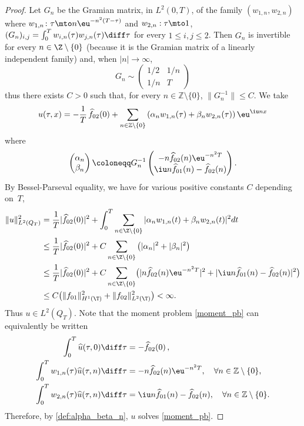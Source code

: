 \begin{proof}
Let $G_n$ be the Gramian matrix, in $L^2(0,T)$, of the family $(w_{1,n},w_{2,n})$ where $w_{1,n}\colon\tau \mto n \eu^{-n^2(T-\tau)}$ and $w_{2,n}: \tau \mto 1$, \ie $(G_n)_{i,j}=\int_0^T w_{i,n}(\tau) w_{j,n}(\tau) \diff\tau$ for every $1 \leq i,j \leq 2$.
Then $G_n$ is invertible for every $n\in\Z\setminus\{0\}$
(because it is the Gramian matrix of a linearly independent family)
and, when $|n| \to \infty$,
\[
G_n \sim \begin{pmatrix}
1/2 & 1/n \\ 1/n & T
\end{pmatrix}
\]
thus there exists $C>0$ such that, for every $n\in\mathbb{Z} \setminus\{0\}$, $\| G_n^{-1} \| \leq C$. We take
\[
u(\tau,x)= - \frac{1}{T}\, \widehat{f}_{02}(0) + \sum_{n\in\mathbb{Z}\setminus\{0\}} \left(\alpha_n w_{1,n}(\tau) + \beta_n w_{2,n}(\tau) \right) \eu^{\iu nx}
\]
where
\begin{equation} \label{def:alpha_beta_n}
\begin{pmatrix} \alpha_n \\ \beta_n \end{pmatrix}\coloneqq G_n^{-1}
\begin{pmatrix}
-n \widehat{f}_{02}(n) \eu^{-n^2 T}
\\
\iu n \widehat{f}_{01}(n) - \widehat{f}_{02}(n)
\end{pmatrix}.
\end{equation}
By Bessel-Parseval equality, we have for various positive constants $C$ depending on~$T$,
\begin{align*}
\|u\|_{L^2(Q_T)}^2
& =\frac{1}{T} |\widehat{f}_{02}(0)|^2 + \int_0^T \sum_{n\in\Z\setminus\{0\}}| \alpha_n w_{1,n}(t) + \beta_n w_{2,n}(t) |^2 dt \\
& \leq \frac{1}{T} |\widehat{f}_{02}(0)|^2 + C\sum_{n\in\Z\setminus\{0\}} \left(|\alpha_n|^2 + |\beta_n|^2 \right) \\
& \leq \frac{1}{T} |\widehat{f}_{02}(0)|^2 + C \sum_{n\in\Z\setminus\{0\}} \bigl(|n \widehat{f}_{02}(n) \eu^{-n^2 T}|^2 + |\iu n \widehat{f}_{01}(n) - \widehat{f}_{02}(n)|^2 \bigr) \\
& \leq C \bigl(\|f_{01}\|_{H^1(\T)}^2 + \|f_{02}\|_{L^2(\T)}^2 \bigr) < \infty.
\end{align*}
Thus $u\in L^2(Q_T)$. Note that the moment problem \eqref{moment_pb}
can equivalently be written
\begin{equation} \label{moment_pb_bis}
\begin{split}
\int_0^T \widehat{u}(\tau,0) \diff \tau&=- \widehat{f}_{02}(0)\,, \\
\int_0^T w_{1,n}(\tau) \widehat{u}(\tau,n) \diff \tau&=- n \widehat{f}_{02}(n) \eu^{-n^2 T}, \quad \forall n \in \mathbb{Z}\setminus\{0\}, \\
\int_0^T w_{2,n}(\tau) \widehat{u}(\tau,n) \diff \tau &= \iu n \widehat{f}_{01}(n) - \widehat{f}_{02}(n), \quad \forall n \in \mathbb{Z}\setminus\{0\}.
\end{split}
\end{equation}
Therefore, by \eqref{def:alpha_beta_n}, $u$ solves \eqref{moment_pb}.
\end{proof}

